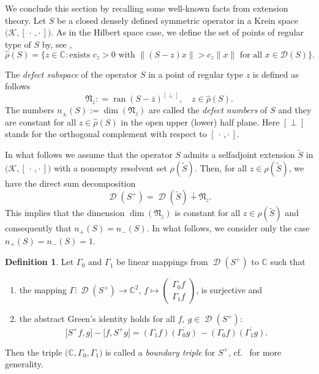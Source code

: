 \documentclass{article}
\numberwithin{equation}{section}
\theoremstyle{definition}
\newtheorem{definition}[theorem]{Definition}
\newcommand{\wt}[1]{\widetilde{#1}}
\newcommand{\wh}[1]{\widehat{#1}}
\newcommand{\kip}{[\,\cdot\, , \cdot\,]}
\newcommand{\C}{\mathbb{C}}
\newcommand{\mD}{\mathcal{D}}
\newcommand{\define}[1]{\textit{#1}}
\DeclareMathOperator{\ran}{ran}
\DeclareMathOperator{\dom}{\mD}
\begin{document}
We conclude this section by recalling some well-known facts from extension theory. 
Let $S$ be a closed densely defined symmetric operator in a Krein space $\bigl({\mathcal K},\kip \bigr)$.
As in the Hilbert space case, we define the  set of points of regular type of $S$ by, see \cite{AG},
\begin{equation*}
    \wh\rho(S) = \{ z \in \C : \text{exists } c_z  > 0 \text{ with } \| (S-z )x \| > c_z  \|x\| \text{ for all } x\in\mD(S)\}.
\end{equation*}

The \define{defect subspace} of the operator $S$ in a point of regular type $z$ is defined as follows
\begin{equation*}
\mathfrak{N}_z : = \ran(S - \overline{z})^{[\perp]}, \quad z \in\wh\rho(S).
\end{equation*}
The numbers $n_\pm(S):=\dim(\mathfrak{N}_z)$ are called the \define{defect numbers} 
of $S$ and they are constant for all $z\in\wh\rho(S)$ in the open upper (lower) half plane. 
Here $[\perp]$ stands for the orthogonal complement with respect to $\kip$.

In what follows we assume that the operator $S$ admits a selfadjoint extension $\wt {S}$ in $\bigl({\mathcal K},\kip\bigr)$ with a nonempty resolvent set $\rho(\wt {S})$. Then, for all $z\in\rho(\wt {S})$, we have the direct sum decomposition
\begin{equation}
   \label{eS*ds}
   \dom(S^{+}) = \dom (\wt {S}) \dotplus \mathfrak{N}_z.
\end{equation}
This implies that the dimension $\dim(\mathfrak{N}_z)$ is constant for all $z \in \rho(\wt {S})$ and consequently that $n_+(S)=n_-(S)$. In what follows, we consider only the case $n_+(S)=n_-(S)=1$.

\begin{definition}
\label{def:BTriple}
Let $\Gamma_0$ and $\Gamma_1$ be linear mappings from $\dom(S^+)$ to $\mathbb C$ such that
\begin{enumerate}[label={\upshape(\roman*)}]
   \item the mapping $\Gamma:\dom(S^+)\rightarrow\mathbb C^2$, 
   $f \mapsto
   \begin{pmatrix}
   	\Gamma_0f\\
   	\Gamma_1f
   \end{pmatrix}$,
   is surjective and
   \item the abstract Green's identity holds for all $f,~g\in \dom(S^+)$:
   \begin{equation}
   \label{Green}
   	\bigl[S^+f, g\bigr] - \bigl[f, S^+ g\bigr] = (\Gamma_1{f})\overline{{(\Gamma_0{g})}}\,-(\Gamma_0{f})\overline{{(\Gamma_1{g})}}.
   \end{equation}
\end{enumerate}
Then the triple $\bigl(\mathbb{C},\Gamma_0,\Gamma_1\bigr)$ is called a \define{boundary triple} for $S^+$, cf.\  \cite{D95,DM91,GG} for more generality.
\end{definition}
\end{document}

